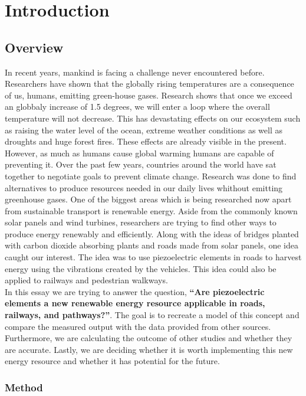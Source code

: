 \chapter{Introduction}

\section{Overview}

In recent years, mankind is facing a challenge never encountered before. Researchers have shown that the globally rising temperatures are a consequence of us, humans, emitting green-house gases. Research shows that once we exceed an globbaly increase of 1.5 degrees, we will enter a loop where the overall temperature will not decrease. This has devastating effects on our ecosystem such as raising the water level of the ocean, extreme weather conditions as well as droughts and huge forest fires. These effects are already visible in the present. However, as much as humans cause global warming humans are capable of preventing it. Over the past few years, countries around the world have sat together to negotiate goals to prevent climate change. Research was done to find alternatives to produce resources needed in our daily lives whithout emitting greenhouse gases. One of the biggest areas which is being researched now apart from sustainable transport is renewable energy. Aside from the commonly known solar panels and wind turbines, researchers are trying to find other ways to produce energy renewably and efficiently. Along with the ideas of bridges planted with carbon dioxide absorbing plants and roads made from solar panels, one idea caught our interest. The idea was to use piezoelectric elements in roads to harvest energy using the vibrations created by the vehicles. This idea could also be applied to railways and pedestrian walkways. \\
In this essay we are trying to answer the question, \textbf{“Are piezoelectric elements a new renewable energy resource applicable in roads, railways, and pathways?”}. The goal is to recreate a model of this concept and compare the measured output with the data provided from other sources. Furthermore, we are calculating the outcome of other studies and whether they are accurate. Lastly, we are deciding whether it is worth implementing this new energy resource and whether it has potential for the future. 

\subsection{Method}

